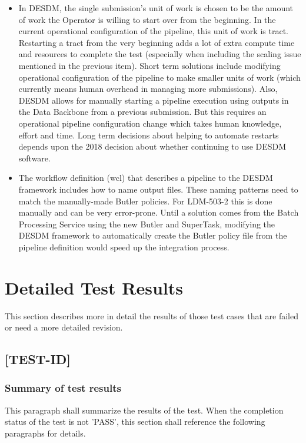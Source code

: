 \documentclass[DM,lsstdraft,STR,toc]{lsstdoc}
\begin{document}
\begin{itemize}
\begin{itemize}
    \item In DESDM, the single submission's unit of work is chosen to
be the amount of work the Operator is willing to start over from
the beginning.   In the current operational configuration of the
pipeline, this unit of work is tract.   Restarting a tract from the
very beginning adds a lot of extra compute time and resources to 
complete the test (especially when including the scaling issue
mentioned in the previous item).   Short term solutions include
modifying operational configuration of the pipeline to make smaller 
units of work (which currently means human overhead in managing
more submissions).   Also, DESDM allows for manually starting a 
pipeline execution using outputs in the Data Backbone from a 
previous submission.   But this requires an operational 
pipeline configuration change which takes human knowledge, effort
and time.   Long term decisions about helping to automate restarts
depends upon the 2018 decision about whether continuing to use DESDM 
software.
	\item The workflow definition (wcl) that describes a pipeline
      to the DESDM framework includes how to name output files.
      These naming patterns need to match the manually-made Butler 
      policies.  For LDM-503-2 this is done manually
	  and can be very error-prone.  Until a solution comes from
      the Batch Processing Service using the new Butler and SuperTask,
      modifying the DESDM framework to automatically create the Butler 
      policy file from the pipeline definition would speed up the 
      integration process. 
  \end{itemize}
\end{itemize}

\newpage

\section{Detailed Test Results \label{sect:detailed}}
This section describes more in detail the results of those test cases that are failed or need a more detailed revision.
\subsection{[TEST-ID]}
\subsubsection{Summary of test results}
This paragraph shall summarize the results of the test. When the completion status of the test is not 'PASS', this section
shall reference the following paragraphs for details.
\end{document}
